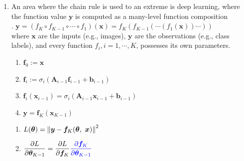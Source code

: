 \begin{enumerate}
    \item An area where the chain rule is used to an extreme is deep learning, where the function value $\bm{y}$ is computed as a many-level function composition 
    \hfill \cite{mfml/book/mml/Deisenroth-Faisal-Ong}
    \\
    .\hfill
    $
        \bm{y}
        = (f_K \circ f_{K-1} \circ \cdots \circ f_1)(\bm{x})
        = f_K (f_{K-1}(\cdots (f_1(\bm{x}))\cdots))
    $
    \hfill \cite{mfml/book/mml/Deisenroth-Faisal-Ong}
    \\
    where $\bm{x}$ are the inputs (e.g., images), $\bm{y}$ are the observations (e.g., class labels), and every function $f_i, i = 1, \cdots , K$, possesses its own parameters.
    \hfill \cite{mfml/book/mml/Deisenroth-Faisal-Ong}
    \\
    \begin{multicols}{2}
    \begin{enumerate}[series=grad-dnn]
        \item $\bm{f}_0 := \bm{x}$
        \hfill \cite{mfml/book/mml/Deisenroth-Faisal-Ong}

        \item $\bm{f}_i := \sigma_i(\bm{A}_{i-1}\bm{f}_{i-1} + \bm{b}_{i-1})$
        \hfill \cite{mfml/book/mml/Deisenroth-Faisal-Ong}

        \item $\bm{f}_i(\bm{x}_{i-1}) = \sigma_i(\bm{A}_{i-1}\bm{x}_{i-1} + \bm{b}_{i-1})$
        \hfill \cite{mfml/book/mml/Deisenroth-Faisal-Ong}

        \item $\bm{y} = \bm{f}_K(\bm{x}_{K-1})$
        \hfill \cite{mfml/book/mml/Deisenroth-Faisal-Ong}
    \end{enumerate}
    \end{multicols}
    \begin{multicols}{2}
    \begin{enumerate}[resume*=grad-dnn]
        \item $L(\bm{\theta}) = \left\| \bm{y} - \bm{f}_K(\bm{\theta},\ \bm{x}) \right\|^2$
        \hfill \cite{mfml/book/mml/Deisenroth-Faisal-Ong}
        
        \item 
        $
            \dfrac{\partial L}{\partial \bm{\theta}_{K-1}}
            = \dfrac{\partial L}{\partial \bm{f}_K} \textcolor{blue}{\dfrac{\partial \bm{f}_K}{\partial \bm{\theta}_{K-1}}}
        $
        \hfill \cite{mfml/book/mml/Deisenroth-Faisal-Ong}


\end{enumerate}
\end{multicols}
\end{enumerate}
